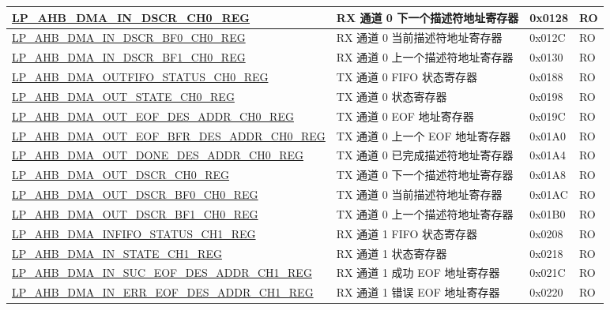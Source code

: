 \begin{longtable}{ | l | l | p{1.3cm} | l | }
\hyperref[regdesc:LPAHBDMAINDSCRCHNREG]{LP\_AHB\_DMA\_IN\_DSCR\_CH0\_REG} & RX 通道 0 下一个描述符地址寄存器 & 0x0128 & RO \\ \hline
\hyperref[regdesc:LPAHBDMAINDSCRBF0CHNREG]{LP\_AHB\_DMA\_IN\_DSCR\_BF0\_CH0\_REG} & RX 通道 0 当前描述符地址寄存器 & 0x012C & RO \\ \hline
\hyperref[regdesc:LPAHBDMAINDSCRBF1CHNREG]{LP\_AHB\_DMA\_IN\_DSCR\_BF1\_CH0\_REG} & RX 通道 0 上一个描述符地址寄存器 & 0x0130 & RO \\ \hline
\hyperref[regdesc:LPAHBDMAOUTFIFOSTATUSCHNREG]{LP\_AHB\_DMA\_OUTFIFO\_STATUS\_CH0\_REG} & TX 通道 0 FIFO 状态寄存器 & 0x0188 & RO \\ \hline
\hyperref[regdesc:LPAHBDMAOUTSTATECHNREG]{LP\_AHB\_DMA\_OUT\_STATE\_CH0\_REG} & TX 通道 0 状态寄存器 & 0x0198 & RO \\ \hline
\hyperref[regdesc:LPAHBDMAOUTEOFDESADDRCHNREG]{LP\_AHB\_DMA\_OUT\_EOF\_DES\_ADDR\_CH0\_REG} & TX 通道 0 EOF 地址寄存器 & 0x019C & RO \\ \hline
\hyperref[regdesc:LPAHBDMAOUTEOFBFRDESADDRCHNREG]{LP\_AHB\_DMA\_OUT\_EOF\_BFR\_DES\_ADDR\_CH0\_REG} & TX 通道 0 上一个 EOF 地址寄存器 & 0x01A0 & RO \\ \hline
\hyperref[regdesc:LPAHBDMAOUTDONEDESADDRCHNREG]{LP\_AHB\_DMA\_OUT\_DONE\_DES\_ADDR\_CH0\_REG} & TX 通道 0 已完成描述符地址寄存器 & 0x01A4 & RO \\ \hline
\hyperref[regdesc:LPAHBDMAOUTDSCRCHNREG]{LP\_AHB\_DMA\_OUT\_DSCR\_CH0\_REG} & TX 通道 0 下一个描述符地址寄存器 & 0x01A8 & RO \\ \hline
\hyperref[regdesc:LPAHBDMAOUTDSCRBF0CHNREG]{LP\_AHB\_DMA\_OUT\_DSCR\_BF0\_CH0\_REG} & TX 通道 0 当前描述符地址寄存器 & 0x01AC & RO \\ \hline
\hyperref[regdesc:LPAHBDMAOUTDSCRBF1CHNREG]{LP\_AHB\_DMA\_OUT\_DSCR\_BF1\_CH0\_REG} & TX 通道 0 上一个描述符地址寄存器 & 0x01B0 & RO \\ \hline
\hyperref[regdesc:LPAHBDMAINFIFOSTATUSCHNREG]{LP\_AHB\_DMA\_INFIFO\_STATUS\_CH1\_REG} & RX 通道 1 FIFO 状态寄存器 & 0x0208 & RO \\ \hline
\hyperref[regdesc:LPAHBDMAINSTATECHNREG]{LP\_AHB\_DMA\_IN\_STATE\_CH1\_REG} & RX 通道 1 状态寄存器 & 0x0218 & RO \\ \hline
\hyperref[regdesc:LPAHBDMAINSUCEOFDESADDRCHNREG]{LP\_AHB\_DMA\_IN\_SUC\_EOF\_DES\_ADDR\_CH1\_REG} & RX 通道 1 成功 EOF 地址寄存器 & 0x021C & RO \\ \hline
\hyperref[regdesc:LPAHBDMAINERREOFDESADDRCHNREG]{LP\_AHB\_DMA\_IN\_ERR\_EOF\_DES\_ADDR\_CH1\_REG} & RX 通道 1 错误 EOF 地址寄存器 & 0x0220 & RO \\ \hline

\end{longtable}
